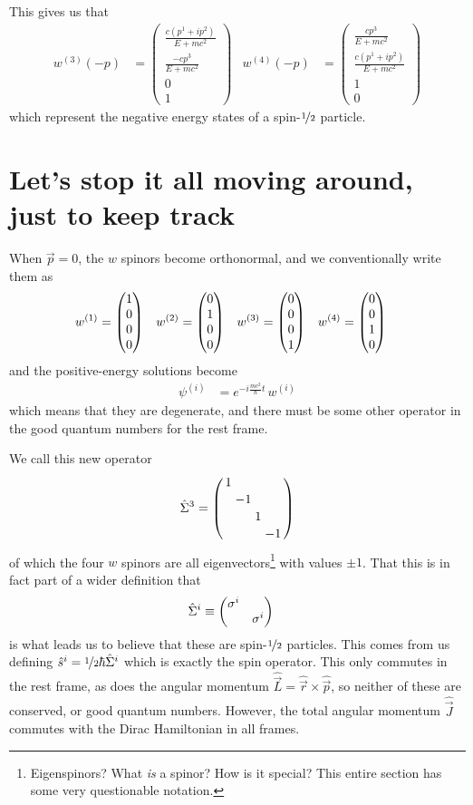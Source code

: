 \documentclass[]{revision-notes}
\begin{document}
This gives us that
\begin{align*}
  w^{(3)}(-p) &= \begin{pmatrix}
    \frac{c(p^1 + i p^2)}{E+mc^2} \\ \frac{-cp^3}{E+mc^2}\\
    0\\ 1
  \end{pmatrix} &
  w^{(4)}(-p) &= \begin{pmatrix}
    \frac{cp^3}{E+mc^2} \\ \frac{c(p^1 + i p^2)}{E+mc^2}\\
    1 \\ 0
  \end{pmatrix}
\end{align*}
which represent the negative energy states of a spin-\(\nicefrac{1}{2}\) particle.

\section{Let's stop it all moving around, just to keep track}
When \(\vec{p} = 0\), the \(w\) spinors become orthonormal, and we conventionally write them as
\begin{align*}
  w^{(1)} &= \mqty(1\\0\\0\\0) &
  w^{(2)} &= \mqty(0\\1\\0\\0) &
  w^{(3)} &= \mqty(0\\0\\0\\1) &
  w^{(4)} &= \mqty(0\\0\\1\\0)
\end{align*}
and the positive-energy solutions become
\begin{align*}
  \psi^{(i)} &= e^{-i\frac{mc^2}{\hbar}t}\, w^{(i)}
\end{align*}
which means that they are degenerate, and there must be some other operator in the good quantum numbers for the rest frame.

We call this new operator \[\hat{\Sigma}^3 = \smqty(\dmat{1,-1,1,-1}) \] of which the four \(w\) spinors are all eigenvectors\footnote{Eigenspinors? What \emph{is} a spinor? How is it special? This entire section has some very questionable notation.} with values \(\pm 1\).
That this is in fact part of a wider definition that
\begin{align}
  \hat{\Sigma}^i &\equiv \mqty(\dmat{\sigma^i,\sigma^i})
\end{align}
is what leads us to believe that these are spin-\(\nicefrac{1}{2}\) particles.
This comes from us defining \(\hat{s}^i = \nicefrac{1}{2} \hbar \hat{\Sigma}^i \) which is exactly the spin operator.
This only commutes in the rest frame, as does the angular momentum \(\hat{\vec{L}} = \hat{\vec{r}}\times \hat{\vec{p}} \), so neither of these are conserved, or good quantum numbers.
However, the total angular momentum \( \hat{\vec{J}} \) commutes with the Dirac Hamiltonian in all frames.
\end{document}
